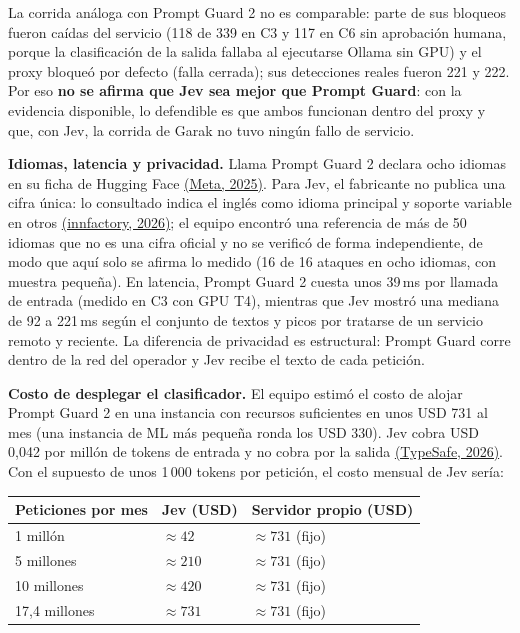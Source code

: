 \documentclass[11pt,letterpaper]{article}
\newcommand{\citeapa}[2]{\hyperlink{#1}{#2}}
\begin{document}
La corrida análoga con Prompt Guard 2 no es comparable: parte de sus bloqueos fueron caídas del servicio (118 de 339 en C3 y 117 en C6 sin aprobación humana, porque la clasificación de la salida fallaba al ejecutarse Ollama sin GPU) y el proxy bloqueó por defecto (falla cerrada); sus detecciones reales fueron 221 y 222. Por eso \textbf{no se afirma que Jev sea mejor que Prompt Guard}: con la evidencia disponible, lo defendible es que ambos funcionan dentro del proxy y que, con Jev, la corrida de Garak no tuvo ningún fallo de servicio.

\textbf{Idiomas, latencia y privacidad.} Llama Prompt Guard 2 declara ocho idiomas en su ficha de Hugging Face \citeapa{metapg2025}{(Meta, 2025)}. Para Jev, el fabricante no publica una cifra única: lo consultado indica el inglés como idioma principal y soporte variable en otros \citeapa{innfactory2026}{(innfactory, 2026)}; el equipo encontró una referencia de más de 50 idiomas que no es una cifra oficial y no se verificó de forma independiente, de modo que aquí solo se afirma lo medido (16 de 16 ataques en ocho idiomas, con muestra pequeña). En latencia, Prompt Guard 2 cuesta unos 39\,ms por llamada de entrada (medido en C3 con GPU T4), mientras que Jev mostró una mediana de 92 a 221\,ms según el conjunto de textos y picos por tratarse de un servicio remoto y reciente. La diferencia de privacidad es estructural: Prompt Guard corre dentro de la red del operador y Jev recibe el texto de cada petición.

\textbf{Costo de desplegar el clasificador.} El equipo estimó el costo de alojar Prompt Guard 2 en una instancia con recursos suficientes en unos USD 731 al mes (una instancia de ML más pequeña ronda los USD 330). Jev cobra USD 0,042 por millón de tokens de entrada y no cobra por la salida \citeapa{typesafe2026}{(TypeSafe, 2026)}. Con el supuesto de unos 1\,000 tokens por petición, el costo mensual de Jev sería:

\begin{center}
\small
\begin{tabular}{@{}p{4.0cm}p{3.6cm}p{4.2cm}@{}}
\toprule
\textbf{Peticiones por mes} & \textbf{Jev (USD)} & \textbf{Servidor propio (USD)} \\
\midrule
1 millón & $\approx 42$ & $\approx 731$ (fijo) \\
5 millones & $\approx 210$ & $\approx 731$ (fijo) \\
10 millones & $\approx 420$ & $\approx 731$ (fijo) \\
17,4 millones & $\approx 731$ & $\approx 731$ (fijo) \\
\bottomrule
\end{tabular}
\end{center}
\end{document}
